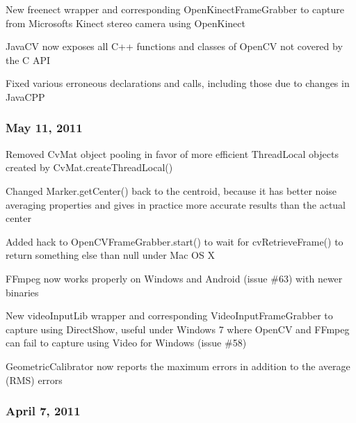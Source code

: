 \begin{DoxyItemize}
\item New {\ttfamily freenect} wrapper and corresponding {\ttfamily Open\+Kinect\+Frame\+Grabber} to capture from Microsoft\textquotesingle{}s Kinect stereo camera using Open\+Kinect
\item Java\+C\+V now exposes all C++ functions and classes of Open\+C\+V not covered by the C A\+P\+I
\item Fixed various erroneous declarations and calls, including those due to changes in Java\+C\+P\+P
\end{DoxyItemize}

\subsubsection*{May 11, 2011}


\begin{DoxyItemize}
\item Removed {\ttfamily Cv\+Mat} object pooling in favor of more efficient {\ttfamily Thread\+Local} objects created by {\ttfamily Cv\+Mat.\+create\+Thread\+Local()}
\item Changed {\ttfamily Marker.\+get\+Center()} back to the centroid, because it has better noise averaging properties and gives in practice more accurate results than the actual center
\item Added hack to {\ttfamily Open\+C\+V\+Frame\+Grabber.\+start()} to wait for {\ttfamily cv\+Retrieve\+Frame()} to return something else than {\ttfamily null} under Mac O\+S X
\item F\+Fmpeg now works properly on Windows and Android (issue \#63) with newer binaries
\item New {\ttfamily video\+Input\+Lib} wrapper and corresponding {\ttfamily Video\+Input\+Frame\+Grabber} to capture using Direct\+Show, useful under Windows 7 where Open\+C\+V and F\+Fmpeg can fail to capture using Video for Windows (issue \#58)
\item {\ttfamily Geometric\+Calibrator} now reports the maximum errors in addition to the average (R\+M\+S) errors
\end{DoxyItemize}

\subsubsection*{April 7, 2011}


